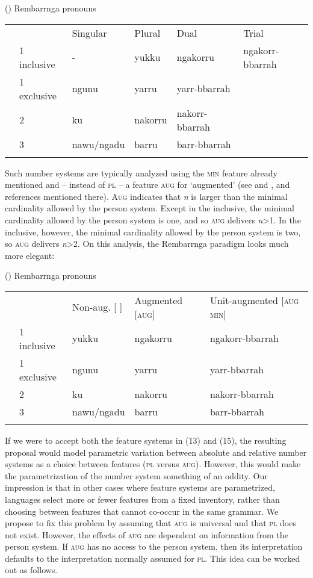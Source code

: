 \documentclass[output=paper]{langsci/langscibook}
\begin{document}
(\label{bkm:Ref451950792})    Rembarrnga pronouns

\begin{tabularx}{\textwidth}{XXXXXX} &  & Singular & Plural & Dual & Trial\\
\lsptoprule
& 1 inclusive & {}- & yukku & ngakorru & ngakorr-bbarrah\\
& 1 exclusive & ngunu & yarru & yarr-bbarrah & \\
& 2 & ku & nakorru & nakorr-bbarrah & \\
& 3 & nawu/ngadu & barru & barr-bbarrah & \\
\lspbottomrule
\end{tabularx}
Such number systems are typically analyzed using the \textsc{min} feature already mentioned and – instead of \textsc{pl} – a feature \textsc{aug} for ‘augmented’ (see \citealt{Bobaljik2008Missing} and \citealt{Cysouw2011}, and references mentioned there). \textsc{Aug} indicates that \textit{n} is larger than the minimal cardinality allowed by the person system. Except in the inclusive, the minimal cardinality allowed by the person system is one, and so \textsc{aug} delivers \textit{n}>1. In the inclusive, however, the minimal cardinality allowed by the person system is two, so \textsc{aug} delivers \textit{n}>2. On this analysis, the Rembarrnga paradigm looks much more elegant:

(\label{bkm:Ref328732397}\label{bkm:Ref295309335})    Rembarrnga pronouns

\begin{tabularx}{\textwidth}{XXXXX}
\lsptoprule
 &  & Non-aug. [ ] & Augmented [\textsc{aug}] & Unit-augmented [\textsc{aug} \textsc{min}]\\
& 1 inclusive & yukku & ngakorru & ngakorr-bbarrah\\
& 1 exclusive & ngunu & yarru & yarr-bbarrah\\
& 2 & ku & nakorru & nakorr-bbarrah\\
& 3 & nawu/ngadu & barru & barr-bbarrah\\
\lspbottomrule
\end{tabularx}

If we were to accept both the feature systems in (13) and (15), the resulting proposal would model parametric variation between absolute and relative number systems as a choice between features (\textsc{pl} versus \textsc{aug}). However, this would make the parametrization of the number system something of an oddity. Our impression is that in other cases where feature systems are parametrized, languages select more or fewer features from a fixed inventory, rather than choosing between features that cannot co-occur in the same grammar. We propose to fix this problem by assuming that \textsc{aug} is universal and that \textsc{pl} does not exist. However, the effects of \textsc{aug} are dependent on information from the person system. If \textsc{aug} has no access to the person system, then its interpretation defaults to the interpretation normally assumed for \textsc{pl}. This idea can be worked out as follows.
\end{document}
